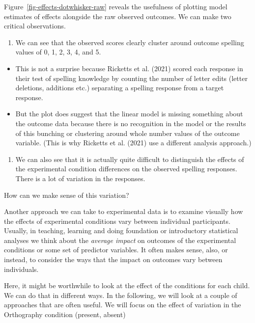 \documentclass[
  letterpaper,
  DIV=11,
  numbers=noendperiod]{scrreprt}
\providecommand{\tightlist}{%
  \setlength{\itemsep}{0pt}\setlength{\parskip}{0pt}}\usepackage{longtable,booktabs,array}
\begin{document}
Figure~\ref{fig-effects-dotwhisker-raw} reveals the usefulness of
plotting model estimates of effects alongside the raw observed outcomes.
We can make two critical observations.

\begin{enumerate}
\def\labelenumi{\arabic{enumi}.}
\tightlist
\item
  We can see that the observed scores clearly cluster around outcome
  spelling values of 0, 1, 2, 3, 4, and 5.
\end{enumerate}

\begin{itemize}
\tightlist
\item
  This is not a surprise because Ricketts et al. (2021) scored each
  response in their test of spelling knowledge by counting the number of
  letter edits (letter deletions, additions etc.) separating a spelling
  response from a target response.
\item
  But the plot does suggest that the linear model is missing something
  about the outcome data because there is no recognition in the model or
  the results of this bunching or clustering around whole number values
  of the outcome variable. (This is why Ricketts et al. (2021) use a
  different analysis approach.)
\end{itemize}

\begin{enumerate}
\def\labelenumi{\arabic{enumi}.}
\setcounter{enumi}{1}
\tightlist
\item
  We can also see that it is actually quite difficult to distinguish the
  effects of the experimental condition differences on the observed
  spelling responses. There is a lot of variation in the responses.
\end{enumerate}

How can we make sense of this variation?

Another approach we can take to experimental data is to examine visually
how the effects of experimental conditions vary between individual
participants. Usually, in teaching, learning and doing foundation or
introductory statistical analyses we think about the \emph{average
impact} on outcomes of the experimental conditions or some set of
predictor variables. It often makes sense, also, or instead, to consider
the ways that the impact on outcomes vary between individuals.

Here, it might be worthwhile to look at the effect of the conditions for
each child. We can do that in different ways. In the following, we will
look at a couple of approaches that are often useful. We will focus on
the effect of variation in the Orthography condition (present, absent)
\end{document}
